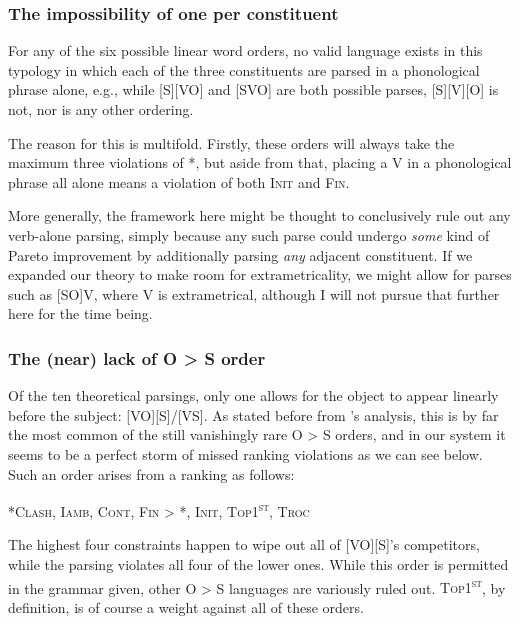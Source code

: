 \documentclass{article}
\newcommand{\noclash}{\textsc{*Clash}}
\newcommand{\iamb}{\textsc{Iamb}}
\newcommand{\cont}{\textsc{Cont}}
\newcommand{\topf}{\textsc{Top1\textsuperscript{st}}}
\newcommand{\nophi}{\textsc{*\textphi}}
\newcommand{\finphi}{\textsc{Fin\textphi}}
\newcommand{\initphi}{\textsc{Init\textphi}}
\newcommand{\troc}{\textsc{Troc}}
\begin{document}
\subsubsection{The impossibility of one {\textphi} per constituent}

For any of the six possible linear word orders, no valid language exists in this typology in which each of the three constituents are parsed in a phonological phrase alone, e.g., while [S][VO] and [SVO] are both possible parses, [S][V][O] is not, nor is any other ordering.

The reason for this is multifold.
Firstly, these orders will always take the maximum three violations of {\nophi}, but aside from that, placing a V in a phonological phrase all alone means a violation of both {\initphi} and {\finphi}.

More generally, the framework here might be thought to conclusively rule out any verb-alone parsing, simply because any such parse could undergo \emph{some} kind of Pareto improvement by additionally parsing \emph{any} adjacent constituent.
If we expanded our theory to make room for extrametricality, we might allow for parses such as [SO]V, where V is extrametrical, although I will not pursue that further here for the time being.

\subsubsection{The (near) lack of O {\textgreater} S order}

Of the ten theoretical parsings, only one allows for the object to appear linearly before the subject: [VO][S]/[VS].
As stated before from \textcite{dryer13}'s analysis, this is by far the most common of the still vanishingly rare O {\textgreater} S orders, and in our system it seems to be a perfect storm of missed ranking violations as we can see below.
Such an order arises from a ranking as follows:

\begin{center}
\noclash, \iamb, \cont, {\finphi} {\textgreater} \nophi, \initphi, \topf, \troc
\end{center}

The highest four constraints happen to wipe out all of [VO][S]'s competitors, while the parsing violates all four of the lower ones.
While this order is permitted in the grammar given, other O {\textgreater} S languages are variously ruled out.
{\topf}, by definition, is of course a weight against all of these orders.
\end{document}
